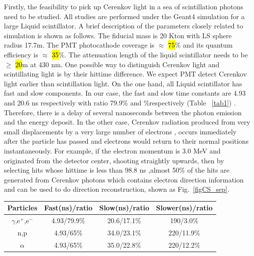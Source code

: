 \documentclass[a4paper,10pt]{cpc-hepnp}
\begin{document}
Firstly, the feasibility to pick up Cerenkov light in a sea of scintillation photons
need to be studied.
All studies are performed under the Geant4 simulation for a large Liquid
scintillator. A brief description of the parameters closely related to
simulation is shown as follows.
The fiducial mass is 20 Kton with LS sphere radius 17.7m.
The PMT photocathode coverage is $\approx$ \hl{75}\% and its
quantum efficiency is
$\approx$ \hl{35}\%. The attenuation length of the liquid
scintillator needs to be $\ge$ \hl{20}m at 430 nm.
 One possible way to distinguish Cerenkov light and scintillating light is by their hittime
difference\cite{lab2}. We expect PMT detect Cerenkov light earlier than scintillation light.
On the one hand, all Liquid scintillator has fast and slow components. In our
case, the fast and slow time constants are 4.93 and 20.6 ns respectively with
ratio  79.9\% and \%respectively (Table ~\ref{tab1}) .
Therefore, there is a delay of several nanoseconds between the photon emission and the energy deposit.
In the other case, Cerenkov radiation produced from very small displacements by a very large number of electrons
, occurs immediately after the particle has passed and electrons would return to their normal positions
 instantaneously\cite{special_article}.
For example, if the electron momentum is 3.0 MeV and originated
from the detector center, shooting straightly upwards, then by selecting hits whose hittime is less than 98.8 ns ,almost 50\% of
the hits are generated from Cerenkov photons which contains electron direction
information and can be used to do direction reconstruction, shown as Fig.~\ref{figCS_sep}.
\begin{center}
\footnotesize
\begin{tabular*}{100mm}{@{\extracolsep{\fill}}cccc}
\toprule Particles & Fast(ns)/ratio & Slow(ns)/ratio &Slower(ns)/ratio \\
\hline
$\gamma$,e$^+$,e$^-$&4.93/79.9\%&20.6/17.1\%&190/3.0\% \\
n,p&4.93/65\%&34.0/23.1\%&220/11.9\% \\
$\alpha$&4.93/65\%&35.0/22.8\%&220/12.2\%\\
\bottomrule
\end{tabular*}
\end{center}
\end{document}
